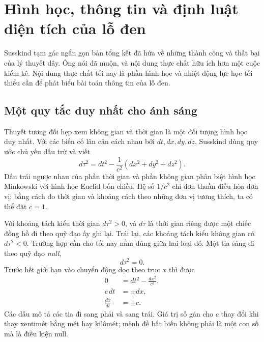 \chapter{Hình học, thông tin và định luật diện tích của lỗ đen}


Susskind tạm gác ngắn gọn bản tổng kết đã hứa về những thành công và thất bại của lý thuyết dây. Ông nói đã muộn, và nội dung thực chất hữu ích hơn một cuộc kiểm kê. Nội dung thực chất tối nay là phần hình học và nhiệt động lực học tối thiểu cần để phát biểu bài toán thông tin của lỗ đen.

\section{Một quy tắc duy nhất cho ánh sáng}

Thuyết tương đối hẹp xem không gian và thời gian là một đối tượng hình học duy nhất. Với các biến cố lân cận cách nhau bởi \(dt,dx,dy,dz\), Susskind dùng quy ước chủ yếu dấu trừ và viết
\begin{equation}
d\tau^2=dt^2-\frac{1}{c^2}\left(dx^2+dy^2+dz^2\right).
\end{equation}
Dấu trái ngược nhau của phần thời gian và phần không gian phân biệt hình học Minkowski với hình học Euclid bốn chiều. Hệ số \(1/c^2\) chỉ đơn thuần điều hòa đơn vị; bằng cách đo thời gian và khoảng cách theo những đơn vị tương thích, ta có thể đặt \(c=1\).

Với khoảng tách kiểu thời gian \(d\tau^2>0\), và \(d\tau\) là thời gian riêng được một chiếc đồng hồ đi theo quỹ đạo ấy ghi lại. Trái lại, các khoảng tách kiểu không gian có \(d\tau^2<0\). Trường hợp cần cho tối nay nằm đúng giữa hai loại đó. Một tia sáng đi theo quỹ đạo \emph{null},
\begin{equation}
d\tau^2=0.
\end{equation}
Trước hết giới hạn vào chuyển động dọc theo trục \(x\) thì được
\begin{align}
0&=dt^2-\frac{dx^2}{c^2},\\
c\,dt&=\pm dx,\\
\frac{dx}{dt}&=\pm c.
\end{align}
Các dấu mô tả các tia đi sang phải và sang trái. Giá trị số gán cho \(c\) thay đổi khi thay xentimét bằng mét hay kilômét; mệnh đề bất biến không phải là một con số mà là điều kiện null.

